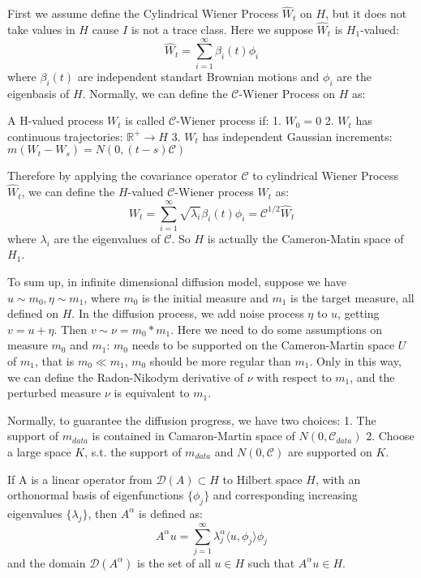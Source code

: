 First we assume define the Cylindrical Wiener Process $\hat{W}_t$ on $H$, but it does not take values in $H$ cause $I$ is not a trace class.
Here we suppose $\hat{W}_t$ is $H_1$-valued:
\begin{equation}
  \hat{W}_t = \sum_{i=1}^{\infty} \beta_i(t) \phi_i
\end{equation}
where $\beta_i(t)$ are independent standart Brownian motions and $\phi_i$ are the eigenbasis of $H$.
Normally, we can define the $\mathcal{C}$-Wiener Process on $H$ as:
\begin{definition}
  A H-valued process $W_t$ is called $\mathcal{C}$-Wiener process if:
  1. $W_0 = 0$
  2. $W_t$ has continuous trajectories: $\mathbb{R}^+\rightarrow H$
  3. $W_t$ has independent Gaussian increments: $m(W_t - W_s) = N(0, (t-s)\mathcal{C})$
\end{definition}
Therefore by applying the covariance operator $\mathcal{C}$ to cylindrical Wiener Process $\hat{W}_t$, we can define the $H$-valued $\mathcal{C}$-Wiener process $W_t$ as:
\begin{equation}
  W_t = \sum_{i=1}^{\infty} \sqrt{\lambda_i} \beta_i(t) \phi_i = \mathcal{C}^{1/2}\hat{W}_t
\end{equation}
where $\lambda_i$ are the eigenvalues of $\mathcal{C}$. 
So $H$ is actually the Cameron-Matin space of $H_1$.

To sum up, in infinite dimensional diffusion model, suppose we have $u\sim m_0, \eta\sim m_1$, where $m_0$ is the initial measure and $m_1$ is the target measure, all defined on $H$.
In the diffusion process, we add noise process $\eta$ to $u$, getting $v = u + \eta$. Then $v\sim \nu=m_0 * m_1$. Here we need to do some assumptions on measure $m_0$ and $m_1$: 
$m_0$ needs to be supported on the Cameron-Martin space $U$ of $m_1$, that is $m_0 \ll m_1$, $m_0$ should be more regular than $m_1$. 
Only in this way, we can define the Radon-Nikodym derivative of $\nu$ with respect to $m_1$, and the perturbed measure $\nu$ is equivalent to $m_1$.

Normally, to guarantee the diffusion progress, we have two choices: 1. The support of $m_{data}$ is contained in Camaron-Martin space of $N(0, \mathcal{C}_{data})$ 2. Choose a large space $K$, s.t. the support of $m_{data}$ and $N(0, \mathcal{C})$ are supported on $K$.

\begin{definition}
    If A is a linear operator from $\mathcal{D}(A) \subset H$ to Hilbert space $H$, with an orthonormal basis of eigenfunctions $\{\phi_j\}$ 
    and corresponding increasing eigenvalues $\{\lambda_j\}$, 
    then $A^{\alpha}$ is defined as:
    \begin{equation}
        A^{\alpha}u = \sum_{j=1}^\infty \lambda_j^\alpha \langle u, \phi_j\rangle \phi_j
    \end{equation}
    and the domain $\mathcal{D}(A^{\alpha})$ is the set of all $u\in H$ such that $A^{\alpha}u\in H$.
\end{definition}

